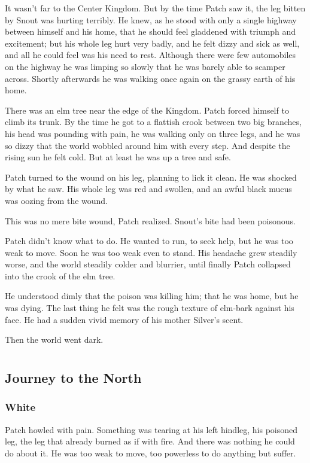 \documentclass[ebook,oneside,openany,17pt]{memoir}
\renewcommand{\thechapter}{\Roman{chapter}}
\newcounter{sections}
\newcommand{\sections}[1]{%
  \section*{#1}
  \addtocounter{sections}{1}%
  \pdfbookmark[1]{#1}{section.\thechapter.\thesections}}
\begin{document}
It wasn’t far to the Center Kingdom. But by the time Patch saw it, the
leg bitten by Snout was hurting terribly. He knew, as he stood with
only a single highway between himself and his home, that he should
feel gladdened with triumph and excitement; but his whole leg hurt
very badly, and he felt dizzy and sick as well, and all he could feel
was his need to rest. Although there were few automobiles on the
highway he was limping so slowly that he was barely able to scamper
across. Shortly afterwards he was walking once again on the grassy
earth of his home.

There was an elm tree near the edge of the Kingdom. Patch forced
himself to climb its trunk. By the time he got to a flattish crook
between two big branches, his head was pounding with pain, he was
walking only on three legs, and he was so dizzy that the world wobbled
around him with every step. And despite the rising sun he felt
cold. But at least he was up a tree and safe.

Patch turned to the wound on his leg, planning to lick it clean. He
was shocked by what he saw. His whole leg was red and swollen, and an
awful black mucus was oozing from the wound.

This was no mere bite wound, Patch realized. Snout’s bite had been
poisonous.

Patch didn’t know what to do. He wanted to run, to seek help, but he
was too weak to move. Soon he was too weak even to stand. His headache
grew steadily worse, and the world steadily colder and blurrier, until
finally Patch collapsed into the crook of the elm tree.

He understood dimly that the poison was killing him; that he was home,
but he was dying. The last thing he felt was the rough texture of
elm-bark against his face. He had a sudden vivid memory of his mother
Silver’s scent.

Then the world went dark.


\part{}

\chapter{Journey to the North}

\sections{White}

Patch howled with pain. Something was tearing at his left hindleg, his
poisoned leg, the leg that already burned as if with fire. And there
was nothing he could do about it. He was too weak to move, too
powerless to do anything but suffer.
\end{document}
